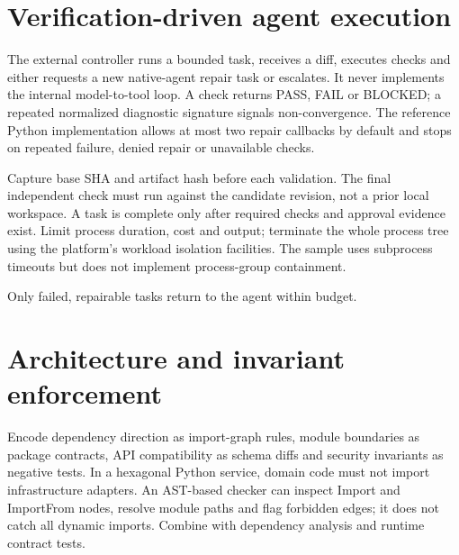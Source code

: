\documentclass[11pt,letterpaper]{article}
\begin{document}
\section{Verification-driven agent execution}
The external controller runs a bounded task, receives a diff, executes checks and either requests a new native-agent repair task or escalates. It never implements the internal model-to-tool loop. A check returns PASS, FAIL or BLOCKED; a repeated normalized diagnostic signature signals non-convergence. The reference Python implementation allows at most two repair callbacks by default and stops on repeated failure, denied repair or unavailable checks.

Capture base SHA and artifact hash before each validation. The final independent check must run against the candidate revision, not a prior local workspace. A task is complete only after required checks and approval evidence exist. Limit process duration, cost and output; terminate the whole process tree using the platform's workload isolation facilities. The sample uses subprocess timeouts but does not implement process-group containment.

\begin{center}\begin{minipage}{\linewidth}\captionsetup{type=figure}\centering{}\caption{Bounded remediation loop}
\small Only failed, repairable tasks return to the agent within budget.\end{minipage}\end{center}
\section{Architecture and invariant enforcement}
Encode dependency direction as import-graph rules, module boundaries as package contracts, API compatibility as schema diffs and security invariants as negative tests. In a hexagonal Python service, domain code must not import infrastructure adapters. An AST-based checker can inspect Import and ImportFrom nodes, resolve module paths and flag forbidden edges; it does not catch all dynamic imports. Combine with dependency analysis and runtime contract tests.
\end{document}
